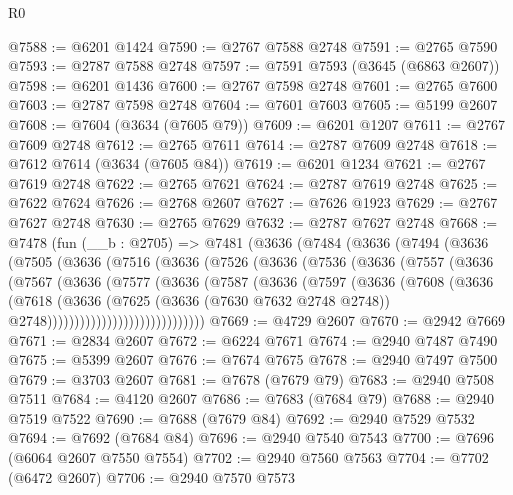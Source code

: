 \begin{lexlean}{R0}
\begin{coremodule}
@7588 := @6201 @1424
@7590 := @2767 @7588 @2748
@7591 := @2765 @7590
@7593 := @2787 @7588 @2748
@7597 := @7591 @7593 (@3645 (@6863 @2607))
@7598 := @6201 @1436
@7600 := @2767 @7598 @2748
@7601 := @2765 @7600
@7603 := @2787 @7598 @2748
@7604 := @7601 @7603
@7605 := @5199 @2607
@7608 := @7604 (@3634 (@7605 @79))
@7609 := @6201 @1207
@7611 := @2767 @7609 @2748
@7612 := @2765 @7611
@7614 := @2787 @7609 @2748
@7618 := @7612 @7614 (@3634 (@7605 @84))
@7619 := @6201 @1234
@7621 := @2767 @7619 @2748
@7622 := @2765 @7621
@7624 := @2787 @7619 @2748
@7625 := @7622 @7624
@7626 := @2768 @2607
@7627 := @7626 @1923
@7629 := @2767 @7627 @2748
@7630 := @2765 @7629
@7632 := @2787 @7627 @2748
@7668 := @7478
    (fun (__b : @2705) =>
    @7481
      (@3636
        (@7484
          (@3636
            (@7494
              (@3636
                (@7505
                  (@3636
                    (@7516
                      (@3636
                        (@7526
                          (@3636
                            (@7536
                              (@3636
                                (@7557
                                  (@3636
                                    (@7567
                                      (@3636
                                        (@7577
                                          (@3636
                                            (@7587
                                              (@3636
                                                (@7597
                                                  (@3636
                                                    (@7608
                                                      (@3636
                                                        (@7618
                                                          (@3636
                                                            (@7625
                                                              (@3636 (@7630 @7632 @2748 @2748))
                                                              @2748)))))))))))))))))))))))))))))
@7669 := @4729 @2607
@7670 := @2942 @7669
@7671 := @2834 @2607
@7672 := @6224 @7671
@7674 := @2940 @7487 @7490
@7675 := @5399 @2607
@7676 := @7674 @7675
@7678 := @2940 @7497 @7500
@7679 := @3703 @2607
@7681 := @7678 (@7679 @79)
@7683 := @2940 @7508 @7511
@7684 := @4120 @2607
@7686 := @7683 (@7684 @79)
@7688 := @2940 @7519 @7522
@7690 := @7688 (@7679 @84)
@7692 := @2940 @7529 @7532
@7694 := @7692 (@7684 @84)
@7696 := @2940 @7540 @7543
@7700 := @7696 (@6064 @2607 @7550 @7554)
@7702 := @2940 @7560 @7563
@7704 := @7702 (@6472 @2607)
@7706 := @2940 @7570 @7573

\end{coremodule}
\end{lexlean}
